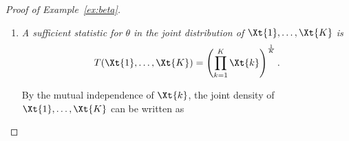 \documentclass[12pt]{article}
\begin{document}
\begin{proof}[Proof of Example~\ref{ex:beta}]
\begin{enumerate}
\begin{align*} 
E\left[\left(\left(\prod_{k=1}^K \Xt{k}\right)^{\frac{1}{K}}\right)^r\right] &= \prod_{k=1}^KE\left[ \left(\Xt{k}\right)^{\frac{r}{K}}\right] \\
&= \prod_{k=1}^K\frac{B(\frac{1}{K}\theta+\frac{k-1}{K}+\frac{r}{K},\frac{1}{K}\beta)}{B(\frac{1}{K}\theta+\frac{k-1}{K},\frac{1}{K}\beta)} \\
&= \prod_{k=1}^K\frac{\frac{\Gamma(\frac{1}{K}\theta+\frac{k-1}{K}+ \frac{r}{K})\Gamma(\frac{1}{K}\beta)}{\Gamma(\frac{1}{K}\theta +\frac{k-1}{K}+ \frac{r}{K}+\frac{1}{K}\beta)}}{\frac{\Gamma(\frac{1}{K}\theta+\frac{k-1}{K})\Gamma(\frac{1}{K}\beta)}{\Gamma(\frac{1}{K}\theta+\frac{k-1}{K}+\frac{1}{K}\beta)}} \\
&= \prod_{k=0}^{K-1}\frac{\Gamma(\frac{1}{K}\theta+ \frac{r}{K}+\frac{k}{K})\Gamma(\frac{1}{K}\theta+\frac{1}{K}\beta+\frac{k}{K})}{\Gamma(\frac{1}{K}\theta+\frac{1}{K}\beta+ \frac{r}{K}+\frac{k}{K})\Gamma(\frac{1}{K}\theta+\frac{k}{K})} \\
&= \frac{\left[\prod_{k=0}^{K-1}\Gamma(\frac{1}{K}\theta+ \frac{r}{K}+\frac{k}{K})\right]\left[\prod_{k=0}^{K-1}\Gamma(\frac{1}{K}\theta+\frac{1}{K}\beta+\frac{k}{K})\right]}{\left[\prod_{k=0}^{K-1}\Gamma(\frac{1}{K}\theta+\frac{1}{K}\beta+ \frac{r}{K}+\frac{k}{K})\right]\left[\prod_{k=0}^{K-1}\Gamma(\frac{1}{K}\theta+\frac{k}{K})\right]} \\
&= \frac{\left[(2\pi)^{\frac{K-1}{2}}K^{\frac{1}{2}-(\theta+r)}\Gamma(\theta+r)\right]\left[(2\pi)^{\frac{K-1}{2}}K^{\frac{1}{2}-(\theta+\beta)}\Gamma(\theta+\beta)\right]}{\left[(2\pi)^{\frac{K-1}{2}}K^{\frac{1}{2}-(\theta+\beta+r)}\Gamma(\theta+\beta+r)\right]\left[(2\pi)^{\frac{K-1}{2}}K^{\frac{1}{2}-\theta}\Gamma(\theta)\right]} \\
&= \frac{\Gamma(\theta+r)\Gamma(\beta)\Gamma(\theta+\beta)}{\Gamma(\theta+\beta+r)\Gamma(\theta)\Gamma(\beta)} \\
&= \frac{B(\theta+r,\beta)}{B(\theta,\beta)}.
\end{align*}
This matches the moments of a $\text{Beta}(\theta, \beta)$ distribution, implying that $\left(\prod_{k=1}^K \Xt{k}\right)^{\frac{1}{K}} \sim \text{Beta}(\theta, \beta)$ as required. 
    
    \item \emph{A sufficient statistic for $\theta$ in the joint distribution of $\Xt{1},\dots,\Xt{K}$ is 
    $$T(\Xt{1},\dots,\Xt{K})=\left(\prod_{k=1}^K \Xt{k}\right)^{\frac1{K}}.$$}

By the mutual independence of $\Xt{k}$, the joint density of $\Xt{1},\dots,\Xt{K}$ can be written as


\end{enumerate}
\end{proof}
\end{document}
